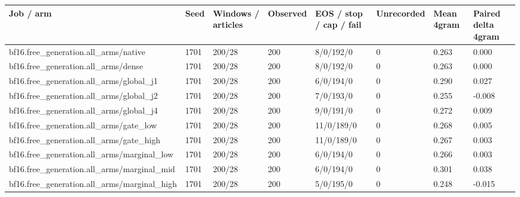 \begin{tabular}{llllllll}
\hline
Job / arm & Seed & Windows / articles & Observed & EOS / stop / cap / fail & Unrecorded & Mean 4gram & Paired delta 4gram \\
\hline
bf16.free\_generation.all\_arms/native & 1701 & 200/28 & 200 & 8/0/192/0 & 0 & 0.263 & 0.000 \\
bf16.free\_generation.all\_arms/dense & 1701 & 200/28 & 200 & 8/0/192/0 & 0 & 0.263 & 0.000 \\
bf16.free\_generation.all\_arms/global\_j1 & 1701 & 200/28 & 200 & 6/0/194/0 & 0 & 0.290 & 0.027 \\
bf16.free\_generation.all\_arms/global\_j2 & 1701 & 200/28 & 200 & 7/0/193/0 & 0 & 0.255 & -0.008 \\
bf16.free\_generation.all\_arms/global\_j4 & 1701 & 200/28 & 200 & 9/0/191/0 & 0 & 0.272 & 0.009 \\
bf16.free\_generation.all\_arms/gate\_low & 1701 & 200/28 & 200 & 11/0/189/0 & 0 & 0.268 & 0.005 \\
bf16.free\_generation.all\_arms/gate\_high & 1701 & 200/28 & 200 & 11/0/189/0 & 0 & 0.267 & 0.003 \\
bf16.free\_generation.all\_arms/marginal\_low & 1701 & 200/28 & 200 & 6/0/194/0 & 0 & 0.266 & 0.003 \\
bf16.free\_generation.all\_arms/marginal\_mid & 1701 & 200/28 & 200 & 6/0/194/0 & 0 & 0.301 & 0.038 \\
bf16.free\_generation.all\_arms/marginal\_high & 1701 & 200/28 & 200 & 5/0/195/0 & 0 & 0.248 & -0.015 \\
\hline
\end{tabular}
